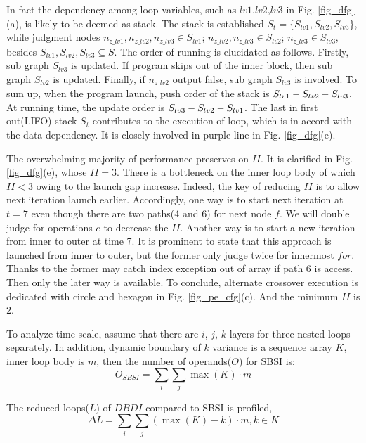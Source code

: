 \documentclass[10pt, conference, compsocconf]{IEEEtran}
\begin{document}
In fact the dependency among loop variables, such as $lv1$,$lv2$,$lv3$ in Fig. \ref{fig_dfg}(a), is likely to be deemed as stack. The stack is established $S_t=\{S_{lv1},S_{lv2},S_{lv3}\}$, while judgment nodes $n_{z\_lv1},n_{z\_lv2},n_{z\_lv3}\in S_{lv1}$; $n_{z\_lv2},n_{z\_lv3}\in S_{lv2}$; $n_{z\_lv3}\in S_{lv3}$, besides $S_{lv1},S_{lv2},S_{lv3}\subseteq S$.
The order of running is elucidated as follows. Firstly, sub graph $S_{lv3}$ is updated. If program skips out of the inner block, then sub graph $S_{lv2}$ is updated. Finally, if $n_{z\_lv2}$ output false, sub graph $S_{lv3}$ is involved. To sum up, when the program launch, push order of the stack is $S_{lv1}\--S_{lv2}\--S_{lv3}$. At running time, the update order is $S_{lv3}\--S_{lv2}\--S_{lv1}$. The last in first out(LIFO) stack $S_t$ contributes to the execution of loop, which is in accord with the data dependency. It is closely involved in purple line in Fig. \ref{fig_dfg}(e).

The overwhelming majority of performance preserves on $II$\cite{bg-epimap}. It is clarified in  Fig. \ref{fig_dfg}(e), whose $II =3$. There is a bottleneck on the inner loop body of which $II < 3$ owing to the launch gap increase. Indeed, the key of reducing $II$ is to allow next iteration launch earlier. Accordingly, one way is to start next iteration at $t = 7$ even though there are two paths(4 and 6) for next node $f$. We will double judge for operations $e$ to decrease the $II$. Another way is to start a new iteration from inner to outer at time 7. It is prominent to state that this approach is launched from inner to outer, but the former only judge twice for innermost $for$. Thanks to the former may catch index exception out of array if path 6 is access. Then only the later way is available. To conclude, alternate crossover execution is dedicated with circle and hexagon in Fig. \ref{fig_pe_cfg}(c). And the minimum $II$ is 2.

 To analyze time scale, assume that there are $i$, $j$, $k$ layers for three nested loops separately. In addition, dynamic boundary of $k$ variance is a sequence array $K$, inner loop body is $m$, then the number of operands($O$) for SBSI is:
 \begin{equation}\label{eq-OSBSI}
 O_{SBSI} = \sum_{i}\sum_{j}\max{(K)} \cdot{m}
 \end{equation}


 The reduced loops($L$) of $DBDI$ compared to SBSI is profiled,
 \begin{equation}\label{eq-L}
 \Delta{L}=\sum_{i}\sum_{j}(\max{(K)} - k )\cdot{m}, k \in K
 \end{equation}
\end{document}
